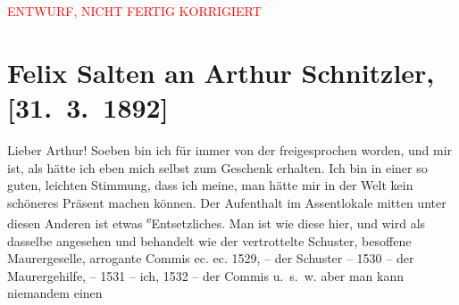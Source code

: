 
\begin{center}
            \textcolor{red}{ENTWURF, NICHT FERTIG KORRIGIERT}
                      \end{center}
            
         
         \renewcommand{\erwaehntePersonen}{Personen:  ?? [Partnerin von Felix Salten, Ende März 1892], Felix Salten}
         \renewcommand{\erwaehnteOrte}{Orte: Café Kremser, Kettenbrücke, Wien}
         \renewcommand{\erwaehnteWerke}{Werke: Tagebuch}
               \section[Felix Salten an Arthur Schnitzler, {[}31. 3. 1892{]}]{ Felix Salten an Arthur Schnitzler, {[}31. 3. 1892{]}}\nopagebreak{}\rehead{ }\begin{ledgroupsized}[t]{13cm}\normalsize\beginnumbering{} \toendnotes[C]{\smallbreak\pagebreak[2]} 
\toendnotes[C]{\smallbreak}\pstart
           \noindent{}{\pb}Lieber Arthur! Soeben bin ich für immer von der
                  \label{K_L03108-1v}\label{K_L03108-1h}
               freigesprochen worden, und mir ist, als hätte ich eben mich selbst zum Geschenk
               erhalten. Ich bin in einer so guten, leichten Stimmung, dass ich meine, man hätte mir
               in der Welt kein schöneres Präsent machen können. Der Aufenthalt {\pb}im Assentlokale mitten
               unter diesen Anderen ist etwas \substVorne{}\textsuperscript{e}\substDazwischen{}E\substHinten{}ntsetzliches. Man ist wie diese hier, und wird als
               dasselbe angesehen und behandelt wie der vertrottelte Schuster, besoffene
               Maurergeselle, arrogante Commis ec. ec. 1529, – der Schuster – 1530 – der
               Maurergehilfe, – 1531 – ich, 1532 – der Commis u. s. w. aber man kann niemandem einen

\end{ledgroupsized}
